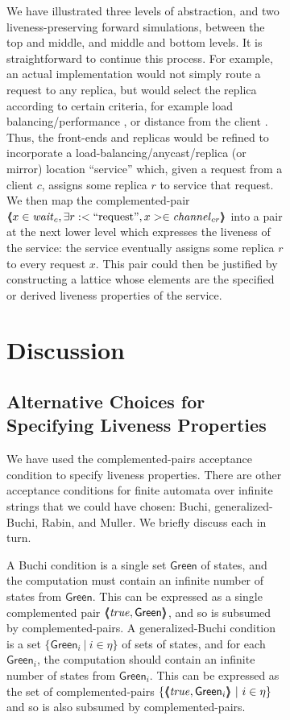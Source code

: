 \documentclass[11pt]{article}
\newcommand{\ex}{\exists}
\newcommand{\GREEN}{\mathsf{Green}}
\newcommand{\pair}[2]{\lpb #1, #2 \rpb}
\newcommand{\lpb}{\langle \hspace{-0.34em} \langle \hspace{-0.34em} \langle}
\newcommand{\rpb}{\rangle \hspace{-0.34em} \rangle \hspace{-0.34em} \rangle}
\newcommand{\chan}{\mathit{channel}}
\newcommand{\req}{\mathrm{``request\mbox{''}}}
\newcommand{\ms}[1]{\relax\ifmmode
                \mathord{\mathcode`\-="702D\it #1\mathcode`\-="2200}\else
{\it #1}\fi
}
\newcommand{\statevar}[1]{\ms{#1}}
\newcommand{\wait}{\statevar{wait}}
\begin{document}
\begin{figure}[htb]
\begin{figure}[htb]
We have illustrated three levels of abstraction, and two
liveness-preserving forward simulations, between the top and middle,
and middle and bottom levels. It is straightforward to continue this
process. For example, an actual implementation would not simply route
a request to any replica, but would select the replica according to
certain criteria, for example load balancing/performance \cite{MDZ99},
or distance from the client \cite{PK00}.
Thus, the front-ends
and replicas would be refined to incorporate a
load-balancing/anycast/replica (or mirror) location ``service'' which,
given a request from a client $c$, assigns some replica $r$ to service
that request. We then map the complemented-pair 
$\pair{x \in \wait_c}{\ex r : <\req, x> \in \chan_{cr}}$
into a pair at the next lower level
which expresses the liveness of the service: the service
eventually assigns some replica $r$ to every request $x$.  This pair could then
be justified by constructing a lattice whose elements are the
specified or derived liveness properties of the service.
 




\section{Discussion}
\label{sec:discussion}


\subsection{Alternative Choices for Specifying Liveness Properties}
\label{sec:alternatives}

We have used the complemented-pairs acceptance condition to specify
liveness properties. There are other acceptance conditions 
for finite automata over infinite strings that we could have
chosen: Buchi, generalized-Buchi, Rabin, and Muller. We briefly
discuss each in turn.

A Buchi condition is a single set $\GREEN$ of states, and the
computation must contain an infinite number of states from $\GREEN$.
This can be expressed as a single complemented
pair $\pair{\true}{\GREEN}$, and so is subsumed by complemented-pairs.
A generalized-Buchi condition  is a set 
$\{ \GREEN_i ~|~ i \in \eta \}$ 
of sets of states, and for each $\GREEN_i$, the computation should
contain an infinite number of states from $\GREEN_i$.
This can be expressed as the set of complemented-pairs
$\{ \pair{\true}{\GREEN_i} ~|~ i \in \eta \}$
and so is also subsumed by complemented-pairs.


\end{figure}
\end{figure}
\end{document}

